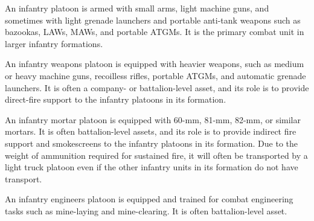 

An infantry platoon is armed with small arms, light machine guns, and sometimes with light grenade launchers and portable anti-tank weapons such as bazookas, LAWs, MAWs, and portable ATGMs. It is the primary combat unit in larger infantry formations.


An infantry weapons platoon is equipped with heavier weapons, such as medium or heavy machine guns, recoilless rifles, portable ATGMs, and automatic grenade launchers.
It is often a company- or battalion-level asset, and its role is to provide direct-fire support to the infantry platoons in its formation.%


An infantry mortar platoon is equipped with 60-mm, 81-mm, 82-mm, or similar mortars.
It is often battalion-level assets, and its role is to provide indirect fire support and smokescreens to the infantry platoons in its formation.
Due to the weight of ammunition required for sustained fire, it will often be transported by a light truck platoon even if the other infantry units in its formation do not have transport.


An infantry engineers platoon is equipped and trained for combat engineering tasks such as mine-laying and mine-clearing.
It is often battalion-level asset.


